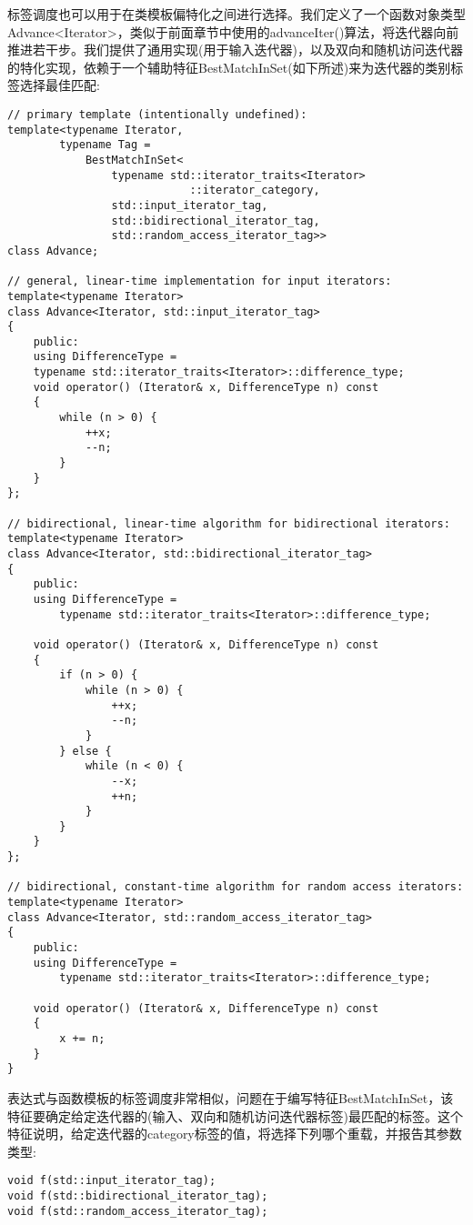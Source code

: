 
标签调度也可以用于在类模板偏特化之间进行选择。我们定义了一个函数对象类型Advance<Iterator>，类似于前面章节中使用的advanceIter()算法，将迭代器向前推进若干步。我们提供了通用实现(用于输入迭代器)，以及双向和随机访问迭代器的特化实现，依赖于一个辅助特征BestMatchInSet(如下所述)来为迭代器的类别标签选择最佳匹配:

\begin{lstlisting}[style=styleCXX]
// primary template (intentionally undefined):
template<typename Iterator,
		typename Tag =
			BestMatchInSet<
				typename std::iterator_traits<Iterator>
							::iterator_category,
				std::input_iterator_tag,
				std::bidirectional_iterator_tag,
				std::random_access_iterator_tag>>
class Advance;

// general, linear-time implementation for input iterators:
template<typename Iterator>
class Advance<Iterator, std::input_iterator_tag>
{
	public:
	using DifferenceType =
	typename std::iterator_traits<Iterator>::difference_type;
	void operator() (Iterator& x, DifferenceType n) const
	{
		while (n > 0) {
			++x;
			--n;
		}
	}
};

// bidirectional, linear-time algorithm for bidirectional iterators:
template<typename Iterator>
class Advance<Iterator, std::bidirectional_iterator_tag>
{
	public:
	using DifferenceType =
		typename std::iterator_traits<Iterator>::difference_type;
		
	void operator() (Iterator& x, DifferenceType n) const
	{
		if (n > 0) {
			while (n > 0) {
				++x;
				--n;
			}
		} else {
			while (n < 0) {
				--x;
				++n;
			}
		}
	}
};

// bidirectional, constant-time algorithm for random access iterators:
template<typename Iterator>
class Advance<Iterator, std::random_access_iterator_tag>
{
	public:
	using DifferenceType =
		typename std::iterator_traits<Iterator>::difference_type;
		
	void operator() (Iterator& x, DifferenceType n) const
	{
		x += n;
	}
}
\end{lstlisting}

表达式与函数模板的标签调度非常相似，问题在于编写特征BestMatchInSet，该特征要确定给定迭代器的(输入、双向和随机访问迭代器标签)最匹配的标签。这个特征说明，给定迭代器的category标签的值，将选择下列哪个重载，并报告其参数类型:

\begin{lstlisting}[style=styleCXX]
void f(std::input_iterator_tag);
void f(std::bidirectional_iterator_tag);
void f(std::random_access_iterator_tag);
\end{lstlisting}

